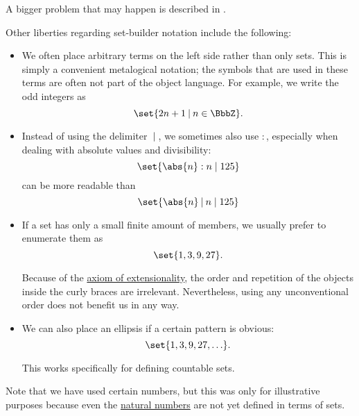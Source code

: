 \begin{definition}
  A bigger problem that may happen is described in .

  Other liberties regarding set-builder notation include the following:
  \begin{itemize}
    \item We often place arbitrary terms on the left side rather than only sets. This is simply a convenient metalogical notation; the symbols that are used in these terms are often not part of the object language. For example, we write the odd integers as
    \begin{equation*}
      \set{ 2n + 1 \given n \in \BbbZ }.
    \end{equation*}

    \item Instead of using the delimiter \( \given \), we sometimes also use \( : \), especially when dealing with absolute values and divisibility:
    \begin{equation*}
      \set{ \abs{n} : n \mid 125 }
    \end{equation*}
    can be more readable than
    \begin{equation*}
      \set{ \abs{n} \given n \mid 125 }
    \end{equation*}

    \item If a set has only a small finite amount of members, we usually prefer to enumerate them as
    \begin{equation*}
      \set{ 1, 3, 9, 27 }.
    \end{equation*}

    Because of the \hyperref[def:naive_set_theory/extensionality]{axiom of extensionality}, the order and repetition of the objects inside the curly braces are irrelevant. Nevertheless, using any unconventional order does not benefit us in any way.

    \item We can also place an ellipsis if a certain pattern is obvious:
    \begin{equation*}
      \set{ 1, 3, 9, 27, \ldots }.
    \end{equation*}

    This works specifically for defining countable sets.
  \end{itemize}

  Note that we have used certain numbers, but this was only for illustrative purposes because even the \hyperref[def:natural_numbers]{natural numbers} are not yet defined in terms of sets.
\end{definition}

